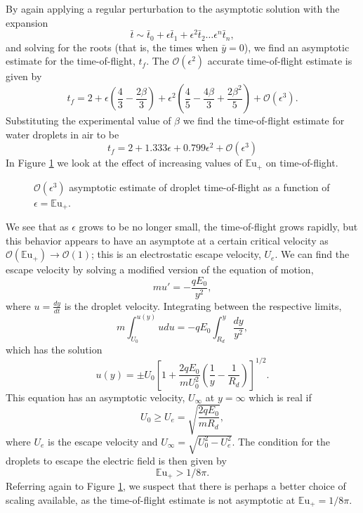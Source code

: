 \documentclass[12pt,a4paper,oneside]{book}
\begin{document}
By again applying a regular perturbation to the asymptotic solution with the expansion
\[ \bar{t} \sim \bar{t}_0 + \epsilon \bar{t}_1 + \epsilon^2 \bar{t}_2 \ldots \epsilon^n\bar{t}_n  
,\]
and solving for the roots (that is, the times when $\bar{y} = 0$), we find an asymptotic estimate for the time-of-flight, $t_f$. The $\mathcal{O}(\epsilon^2)$ accurate time-of-flight estimate is given by
\[t_f = 2 + \epsilon \left(\frac{4}{3} - \frac{2 \beta}{3}\right) + \epsilon^{2} \left(\frac{4}{5} - \frac{4 \beta}{3} + \frac{2 \beta^{2}}{5}\right) + \mathcal{O}(\epsilon^3).\]
Substituting the experimental value of $\beta$ we find the time-of-flight estimate for water droplets in air to be
\begin{equation} \label{time_of_flight}
t_f = 2 + 1.333 \epsilon + 0.799 \epsilon^{2} + \mathcal{O}(\epsilon^3) 
\end{equation} 
In Figure \ref{fig:drag} we look at the effect of increasing values of ${\mathbb{E}\mbox{u}}_+$ on time-of-flight.
\begin{figure}[htb]
    \centering
    
    \caption{$\mathcal{O}(\epsilon^3)$ asymptotic estimate of droplet time-of-flight as a function of $\epsilon = {\mathbb{E}\mbox{u}}_+$.}
    \label{fig:drag}
\end{figure}
We see that as $\epsilon$ grows to be no longer small, the time-of-flight grows rapidly, but this behavior appears to have an asymptote at a certain critical velocity as $\mathcal{O}({\mathbb{E}\mbox{u}}_+) \rightarrow \mathcal{O}(1)$; this is an electrostatic escape velocity, $U_e$. We can find the escape velocity by solving a modified version of the equation of motion,
\[ m u' = - \frac{q E_0}{y^2}, \]
where $u = \frac{d y}{d t}$ is the droplet velocity. Integrating between the respective limits,
\[m \int^{u(y)}_{U_0} u du = -q E_0 \int^y_{R_d} \frac{dy}{y^2} ,\]
which has the solution
\[ u(y) = \pm U_0 \left[1 + \frac{2q E_0}{m U_0^2} \left( \frac{1}{y} - \frac{1}{R_d} \right) \right]^{1/2}.
\]
This equation has an asymptotic velocity, $U_{\infty}$ at $y = \infty$ which is real if 
\[ U_0 \geq  U_e = \sqrt{\frac{2 q E_0}{m R_d}},
\]
where $U_e$ is the escape velocity and $U_{\infty} = \sqrt{U_0^2 - U_e^2}$. The condition for the droplets to escape the electric field is then given by
\begin{equation}\label{escape}
{\mathbb{E}\mbox{u}}_+ > 1/8 \pi.
\end{equation}
Referring again to Figure \ref{fig:drag}, we suspect that there is perhaps a better choice of scaling available, as the time-of-flight estimate is not asymptotic at ${\mathbb{E}\mbox{u}}_+ = 1/8 \pi$.
\end{document}

